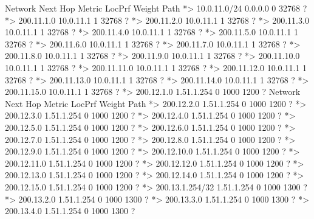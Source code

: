 \documentclass[10pt]{article}
\begin{document}
\begin{itemize}
\begin{verbatim*}
		   Network          Next Hop            Metric LocPrf Weight Path
		*> 10.0.11.0/24     0.0.0.0                  0         32768 ?
		*> 200.11.1.0       10.0.11.1                1         32768 ?
		*> 200.11.2.0       10.0.11.1                1         32768 ?
		*> 200.11.3.0       10.0.11.1                1         32768 ?
		*> 200.11.4.0       10.0.11.1                1         32768 ?
		*> 200.11.5.0       10.0.11.1                1         32768 ?
		*> 200.11.6.0       10.0.11.1                1         32768 ?
		*> 200.11.7.0       10.0.11.1                1         32768 ?
		*> 200.11.8.0       10.0.11.1                1         32768 ?
		*> 200.11.9.0       10.0.11.1                1         32768 ?
		*> 200.11.10.0      10.0.11.1                1         32768 ?
		*> 200.11.11.0      10.0.11.1                1         32768 ?
		*> 200.11.12.0      10.0.11.1                1         32768 ?
		*> 200.11.13.0      10.0.11.1                1         32768 ?
		*> 200.11.14.0      10.0.11.1                1         32768 ?
		*> 200.11.15.0      10.0.11.1                1         32768 ?
		*> 200.12.1.0       1.51.1.254                             0 1000 1200 ?
		   Network          Next Hop            Metric LocPrf Weight Path
		*> 200.12.2.0       1.51.1.254                             0 1000 1200 ?
		*> 200.12.3.0       1.51.1.254                             0 1000 1200 ?
		*> 200.12.4.0       1.51.1.254                             0 1000 1200 ?
		*> 200.12.5.0       1.51.1.254                             0 1000 1200 ?
		*> 200.12.6.0       1.51.1.254                             0 1000 1200 ?
		*> 200.12.7.0       1.51.1.254                             0 1000 1200 ?
		*> 200.12.8.0       1.51.1.254                             0 1000 1200 ?
		*> 200.12.9.0       1.51.1.254                             0 1000 1200 ?
		*> 200.12.10.0      1.51.1.254                             0 1000 1200 ?
		*> 200.12.11.0      1.51.1.254                             0 1000 1200 ?
		*> 200.12.12.0      1.51.1.254                             0 1000 1200 ?
		*> 200.12.13.0      1.51.1.254                             0 1000 1200 ?
		*> 200.12.14.0      1.51.1.254                             0 1000 1200 ?
		*> 200.12.15.0      1.51.1.254                             0 1000 1200 ?
		*> 200.13.1.254/32  1.51.1.254                             0 1000 1300 ?
		*> 200.13.2.0       1.51.1.254                             0 1000 1300 ?
		*> 200.13.3.0       1.51.1.254                             0 1000 1300 ?
		*> 200.13.4.0       1.51.1.254                             0 1000 1300 ?

\end{verbatim*}
\end{itemize}
\end{document}
